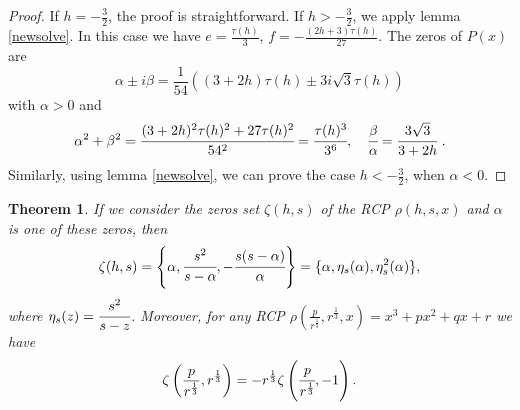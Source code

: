 \documentclass[12pt,reqno]{article}
\newtheorem{theorem}{Theorem}
\begin{document}
\begin{proof}
If $h=-\frac{3}{2}$, the proof is straightforward.
If $h>-\frac{3}{2}$, we apply lemma \ref{newsolve}. In this case we have $e=\frac{\tau(h)}{3}$, $f=-\frac{(2h+3)\tau(h)}{27}$. The zeros of $P(x)$ are 
$$\alpha\pm i\beta=\frac{1}{54}((3+2h)\tau(h)\pm 3i\sqrt{3}\tau(h))$$
with $\alpha>0$ and
$$\alpha^2+\beta^2=\cfrac{(3+2h)^2\tau(h)^2+27\tau(h)^2}{54^2}=\cfrac{\tau(h)^3}{3^6},\quad \cfrac{\beta}{\alpha}=\cfrac{3\sqrt{3}}{3+2h}\ .$$
Similarly, using lemma \ref{newsolve}, we can prove the case $h<-\frac{3}{2}$, when $\alpha<0$.
\end{proof}
\begin{theorem} \label{root-rcp}
If we consider the zeros set $\zeta(h,s)$ of the RCP $\rho(h,s,x)$ and $\alpha$ is one of these zeros, then
\begin{equation}\label{eta}\zeta(h,s)=\left\{\alpha,\cfrac{s^2}{s-\alpha},-\cfrac{s(s-\alpha)}{\alpha}\right\}=\{\alpha,\eta_s(\alpha),\eta_s^2(\alpha)\},\end{equation}
where $\eta_s(z)=\cfrac{s^2}{s-z}$.
Moreover, for any RCP $\rho\left(\frac{p}{r^{\frac{1}{3}}},r^{\frac{1}{3}},x\right)=x^3+px^2+qx+r$  we have
\begin{equation}\label{zeta}\zeta\left(\frac{p}{r^{\frac{1}{3}}},r^{\frac{1}{3}}\right)=-r^{\frac{1}{3}}\zeta\left(\cfrac{p}{r^{\frac{1}{3}}},-1\right).\end{equation}
\end{theorem}
\end{document}
